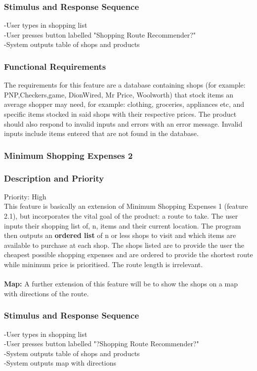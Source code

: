 \documentclass[12pt]{article}
\begin{document}
 \subsubsection*{Stimulus and Response Sequence}     
-User types in shopping list\\
-User presses button labelled "Shopping Route Recommender?"\\
-System outputs table of shops and products\\
 \subsubsection*{Functional Requirements}
 The requirements for this feature are a database  containing shops (for example: PNP,Checkers,game, DionWired, Mr Price, Woolworth) that stock items an average shopper may need, for example: clothing, groceries, appliances etc, and specific items stocked in said shops with their respective prices. The product should also respond to invalid inputs and errors with an error message. Invalid inputs include items entered that are not found in the database.
 
 \subsubsection{Minimum Shopping Expenses 2}
\subsubsection*{Description and Priority}
 Priority: High\\
 This feature is basically an extension of Minimum Shopping Expenses 1 (feature 2.1), but incorporates the vital goal of the product: a route to take. The user inputs their shopping list of, n, items and their current location. The program then outputs an \textbf{ordered list} of n or less shops to visit and which items are available to purchase at each shop. The shops listed are to provide the user the cheapest possible shopping expenses and are ordered to provide the shortest route while minimum price is prioritised. The route length is irrelevant. 
\\\\
\textbf{Map:} A further extension of this feature will be to show the shops on a map with directions of the route.
 \subsubsection*{Stimulus and Response Sequence}
-User types in shopping list\\
-User presses button labelled "?Shopping Route Recommender?"\\
-System outputs table of shops and products\\
-System outputs map with directions\\
\end{document}
